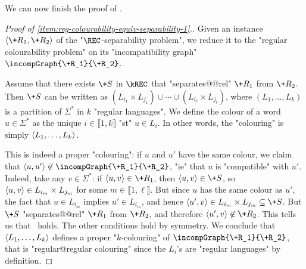 We can now finish the proof of .

\begin{proof}[Proof of \eqref{item:reg-colourability-equiv-separability-1}.]
    \AP Given an instance $\tup{\+R_1,\+R_2}$ of the "$\REC$-separability problem", we
    reduce it to the "regular colourability problem" on its "incompatibility graph"
    $\incompGraph{\+R_1}{\+R_2}$.

    Assume that there exists $\+S$ in $\kREC$ that "separates@@rel" $\+R_1$ from $\+R_2$.
    Then $\+S$ can be written as $(L_{i_1}\times L_{j_1}) \cup \cdots \cup (L_{i_\ell}\times L_{j_\ell})$, 
    where $(L_1,\hdots,L_k)$ is a partition of $\Sigma^*$ in $k$ "regular languages".
    We define the colour of a word $u \in \Sigma^*$ as the unique $i \in \lBrack 1,k \rBrack$
    "st" $u \in L_i$. In other words, the "colouring" is simply $\langle L_1,\hdots,L_k\rangle$. 

    This is indeed a proper "colouring": if $u$ and $u'$ have the same colour,
    we claim that $\tup{u,u'} \not\in \incompGraph{\+R_1}{\+R_2}$, "ie" that
    $u$ is "compatible" with $u'$. Indeed, take any $v \in \Sigma^*$: if $\tup{u,v} \in \+R_1$,
    then $\tup{u,v} \in \+S$, so $\langle u,v\rangle \in L_{i_m}\times L_{j_m}$ for some $m \in \lBrack 1,\ell\rBrack$. But since $u$ has the same colour 
    as $u'$, the fact that $u \in L_{i_m}$ implies $u' \in L_{i_m}$, and hence 
    $\tup{u',v} \in L_{i_m}\times L_{j_m}\subseteq \+S$.
    But $\+S$ "separates@@rel" $\+R_1$ from $\+R_2$, and therefore $\tup{u',v} \not\in \+R_2$.
    This tells us that \compL\ holds. The other conditions hold by symmetry.
    We conclude that $\langle L_1,\hdots,L_k\rangle$ defines
    a proper "$k$-colouring" of $\incompGraph{\+R_1}{\+R_2}$, that is "regular@regular colouring" since the $L_i$'s are "regular languages" by definition.


\end{proof}
